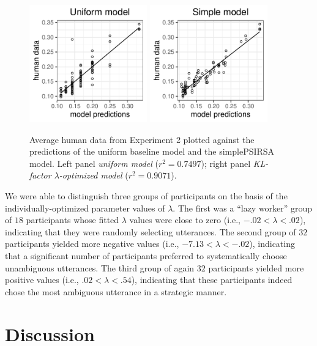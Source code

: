 \documentclass[10pt,a4paper]{article}
\begin{document}
\begin{figure}[ht]
	\centering
	\includegraphics[width=2in]{images/x3_m20.pdf}
	\includegraphics[width=2in]{images/x3_m11.pdf}
	\caption{Average human data from Experiment 2 plotted against the predictions of the uniform baseline model and the simplePSIRSA model. Left panel \emph{uniform model} ($r^{2}=0.7497$); right panel \emph{KL-factor $\lambda$-optimized model} ($r^{2}=0.9071$). }\label{kl-factor}
\end{figure}

We were able to distinguish three groups of participants on the basis of the individually-optimized parameter values of $\lambda$. 
The first was a ``lazy worker'' group of $18$ participants whose fitted $\lambda$ values were close to zero (i.e.,  $-.02 < \lambda<.02$), indicating that they were randomly selecting utterances.
The second group of $32$ participants yielded more negative values (i.e., $-7.13<\lambda<-.02$), indicating that a significant number of participants preferred to systematically choose unambiguous utterances. 
The third group of again $32$ participants yielded more positive values (i.e., $.02<\lambda<.54$), indicating that these participants indeed chose the most ambiguous utterance in a strategic manner. 

\section*{Discussion}
\end{document}
